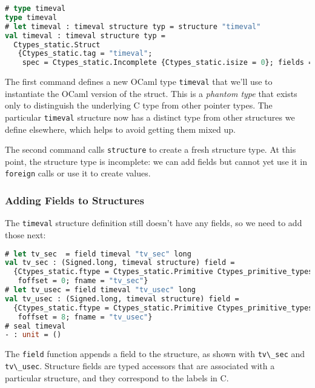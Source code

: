 \begin{lstlisting}[language=Caml]
# type timeval
type timeval
# let timeval : timeval structure typ = structure "timeval"
val timeval : timeval structure typ =
  Ctypes_static.Struct
   {Ctypes_static.tag = "timeval";
    spec = Ctypes_static.Incomplete {Ctypes_static.isize = 0}; fields = []}
\end{lstlisting}

The first command defines a new OCaml type
\passthrough{\lstinline!timeval!} that we'll use to instantiate the
OCaml version of the struct. This is a \emph{phantom type} that exists
only to distinguish the underlying C type from other pointer types. The
particular \passthrough{\lstinline!timeval!} structure now has a
distinct type from other structures we define elsewhere, which helps to
avoid getting them mixed up.

The second command calls \passthrough{\lstinline!structure!} to create a
fresh structure type. At this point, the structure type is incomplete:
we can add fields but cannot yet use it in
\passthrough{\lstinline!foreign!} calls or use it to create values.

\hypertarget{adding-fields-to-structures}{%
\subsubsection{Adding Fields to
Structures}\label{adding-fields-to-structures}}

The \passthrough{\lstinline!timeval!} structure definition still doesn't
have any fields, so we need to add those next:

\begin{lstlisting}[language=Caml]
# let tv_sec  = field timeval "tv_sec" long
val tv_sec : (Signed.long, timeval structure) field =
  {Ctypes_static.ftype = Ctypes_static.Primitive Ctypes_primitive_types.Long;
   foffset = 0; fname = "tv_sec"}
# let tv_usec = field timeval "tv_usec" long
val tv_usec : (Signed.long, timeval structure) field =
  {Ctypes_static.ftype = Ctypes_static.Primitive Ctypes_primitive_types.Long;
   foffset = 8; fname = "tv_usec"}
# seal timeval
- : unit = ()
\end{lstlisting}

The \passthrough{\lstinline!field!} function appends a field to the
structure, as shown with \passthrough{\lstinline!tv\_sec!} and
\passthrough{\lstinline!tv\_usec!}. Structure fields are typed accessors
that are associated with a particular structure, and they correspond to
the labels in C.

